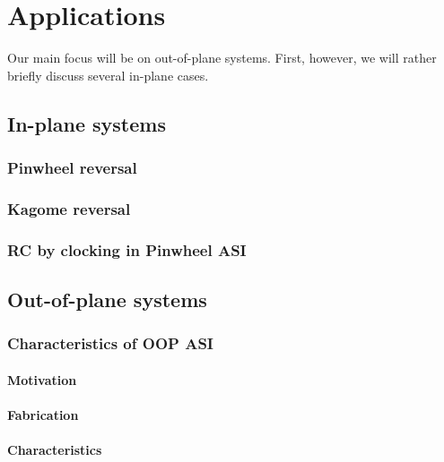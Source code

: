 \chapter{Applications}\label{ch:Applications}

Our main focus will be on out-of-plane systems. First, however, we will rather briefly discuss several in-plane cases.

\section{In-plane systems}
\subsection{Pinwheel reversal}\label{sec:3:IP_Pinwheel_reversal}
\subsection{Kagome reversal}
\subsection{RC by clocking in Pinwheel ASI}

\section{Out-of-plane systems}
\subsection{Characteristics of OOP ASI}
\subsubsection{Motivation} %
\subsubsection{Fabrication} %
\subsubsection{Characteristics} %

